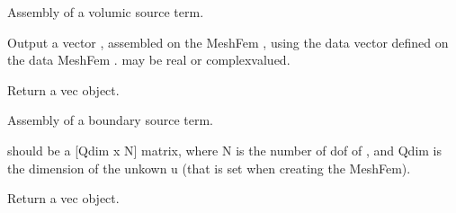 \documentclass[a4paper,11pt,english]{sphinxmanual}
\begin{document}

\begin{fulllineitems}
\label{\detokenize{python/cmdref_Module asm:getfem.asm_volumic_source}}
Assembly of a volumic source term.

Output a vector , assembled on the MeshFem , using the data
vector  defined on the data MeshFem .  may be real or
complex\sphinxhyphen{}valued.

Return a vec object.

\end{fulllineitems}


\begin{fulllineitems}
\label{\detokenize{python/cmdref_Module asm:getfem.asm_boundary_source}}
Assembly of a boundary source term.

 should be a {[}Qdim x N{]} matrix, where N is the number of dof
of , and Qdim is the dimension of the unkown u (that is set
when creating the MeshFem).

Return a vec object.

\end{fulllineitems}

\end{document}
